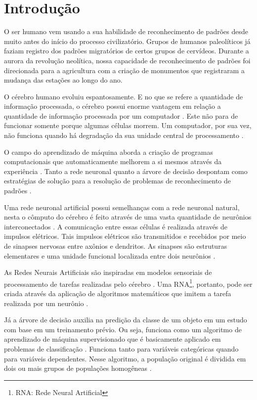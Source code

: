\chapter{Introdução}

O ser humano vem usando a sua habilidade de reconhecimento de padrões desde  muito antes do início do processo civilizatório. Grupos de humanos paleolíticos já faziam registro dos padrões migratórios de certos grupos de cervídeos. Durante a aurora da revolução neolítica, nossa capacidade de reconhecimento de padrões foi direcionada para a agricultura com a criação de monumentos que registraram a mudança das estações ao longo do ano.

O cérebro humano evoluiu espantosamente. E no que se refere a quantidade de informação processada, o cérebro possui enorme vantagem em relação a quantidade de informação processada por um computador \citep{Hall2014}. Este não para de funcionar somente porque algumas células morrem. Um computador, por sua vez, não funciona quando há degradação da sua unidade central de processamento \citep{Mao1996}.

O campo do aprendizado de máquina aborda a criação de programas computacionais que automaticamente melhorem a si mesmos através da experiência \citep{Levy1997,Michie1994}. Tanto a rede neuronal quanto a árvore de decisão despontam como estratégias de solução para a resolução de problemas de reconhecimento de padrões \citep{MacKay2005}.


Uma rede neuronal artificial possui semelhanças com a rede neuronal natural, nesta o cômputo do cérebro é feito através de uma vasta quantidade de neurônios interconectados \citep{Feldman1988,Poulton2002}. A comunicação entre essas células é realizada através de impulsos elétricos. Tais impulsos elétricos são transmitidos e recebidos por meio de sinapses nervosas entre axônios e dendritos. As sinapses são estruturas elementares e uma unidade funcional localizada entre dois neurônios \citep{Krogh2008}. 

As Redes Neurais Artificiais são inspiradas em modelos sensoriais de processamento de tarefas realizadas pelo cérebro \citep{Hagan1996}. Uma RNA\footnote{RNA: Rede Neural Artificial}, portanto, pode ser criada através da aplicação de algoritmos matemáticos que imitem a tarefa realizada por um neurônio \citep{Nedjah2016}. 

Já a árvore de decisão auxilia na predição da classe de um objeto em um estudo com base em um treinamento prévio. Ou seja, funciona como um algoritmo de aprendizado de máquina supervisionado que é basicamente aplicado em problemas de classificação \citep{FreundYoav1999}. Funciona tanto para variáveis categóricas quando para variáveis dependentes. Nesse algoritmo, a população original é dividida em dois ou mais grupos de populações homogêneas \citep{Simard2000}. 

